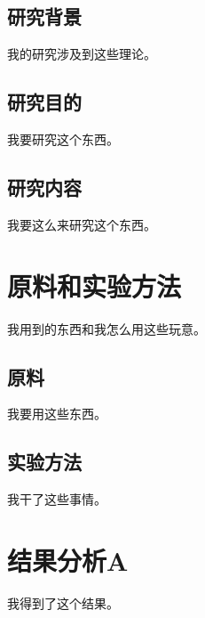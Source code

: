 \documentclass[a4paper]{article}
\begin{document}
    \subsection{研究背景}
    \begin{body}
        我的研究涉及到这些理论。\par
    \end{body}
    \subsection{研究目的}
    \begin{body}
        我要研究这个东西。\par
    \end{body}
    \subsection{研究内容}
    \begin{body}
        我要这么来研究这个东西。\par
    \end{body}
    \section{原料和实验方法}
    \begin{body}
        我用到的东西和我怎么用这些玩意。\par
    \end{body}
    \subsection{原料}
    \begin{body}
        我要用这些东西。\par
    \end{body}
    \subsection{实验方法}
    \begin{body}
        我干了这些事情。\par
    \end{body}
    \section{结果分析A}
    \begin{body}
        我得到了这个结果。\par
    \end{body}
\end{document}
